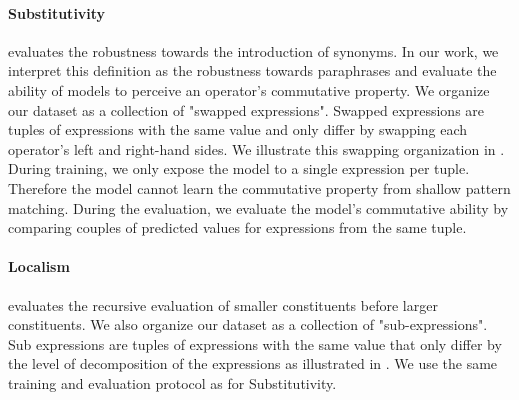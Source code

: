 \paragraph{Substitutivity} evaluates the robustness towards the introduction of synonyms. In our work, we interpret this definition as the robustness towards paraphrases and evaluate the ability of models to perceive an operator's commutative property. We organize our dataset as a collection of "swapped expressions". Swapped expressions are tuples of expressions with the same value and only differ by swapping each operator's left and right-hand sides. We illustrate this swapping organization in . During training, we only expose the model to a single expression per tuple. Therefore the model cannot learn the commutative property from shallow pattern matching. During the evaluation, we evaluate the model's commutative ability by comparing couples of predicted values for expressions from the same tuple.


\paragraph{Localism} evaluates the recursive evaluation of smaller constituents before larger constituents. We also organize our dataset as a collection of "sub-expressions". Sub expressions are tuples of expressions with the same value that only differ by the level of decomposition of the expressions as illustrated in . We use the same training and evaluation protocol as for Substitutivity.



